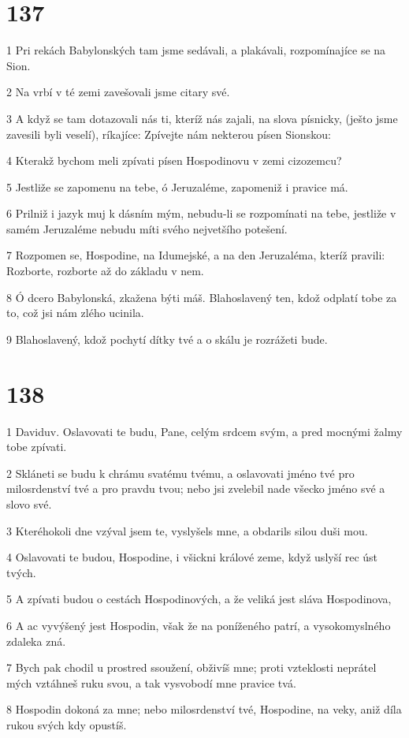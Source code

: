 \chapter{137}

\par 1 Pri rekách Babylonských tam jsme sedávali, a plakávali, rozpomínajíce se na Sion.
\par 2 Na vrbí v té zemi zavešovali jsme citary své.
\par 3 A když se tam dotazovali nás ti, kteríž nás zajali, na slova písnicky, (ješto jsme zavesili byli veselí), ríkajíce: Zpívejte nám nekterou písen Sionskou:
\par 4 Kterakž bychom meli zpívati písen Hospodinovu v zemi cizozemcu?
\par 5 Jestliže se zapomenu na tebe, ó Jeruzaléme, zapomeniž i pravice má.
\par 6 Prilniž i jazyk muj k dásním mým, nebudu-li se rozpomínati na tebe, jestliže v samém Jeruzaléme nebudu míti svého nejvetšího potešení.
\par 7 Rozpomen se, Hospodine, na Idumejské, a na den Jeruzaléma, kteríž pravili: Rozborte, rozborte až do základu v nem.
\par 8 Ó dcero Babylonská, zkažena býti máš. Blahoslavený ten, kdož odplatí tobe za to, což jsi nám zlého ucinila.
\par 9 Blahoslavený, kdož pochytí dítky tvé a o skálu je rozrážeti bude.

\chapter{138}

\par 1 Daviduv. Oslavovati te budu, Pane, celým srdcem svým, a pred mocnými žalmy tobe zpívati.
\par 2 Skláneti se budu k chrámu svatému tvému, a oslavovati jméno tvé pro milosrdenství tvé a pro pravdu tvou; nebo jsi zvelebil nade všecko jméno své a slovo své.
\par 3 Kteréhokoli dne vzýval jsem te, vyslyšels mne, a obdarils silou duši mou.
\par 4 Oslavovati te budou, Hospodine, i všickni králové zeme, když uslyší rec úst tvých.
\par 5 A zpívati budou o cestách Hospodinových, a že veliká jest sláva Hospodinova,
\par 6 A ac vyvýšený jest Hospodin, však že na poníženého patrí, a vysokomyslného zdaleka zná.
\par 7 Bych pak chodil u prostred ssoužení, obživíš mne; proti vzteklosti neprátel mých vztáhneš ruku svou, a tak vysvobodí mne pravice tvá.
\par 8 Hospodin dokoná za mne; nebo milosrdenství tvé, Hospodine, na veky, aniž díla rukou svých kdy opustíš.

